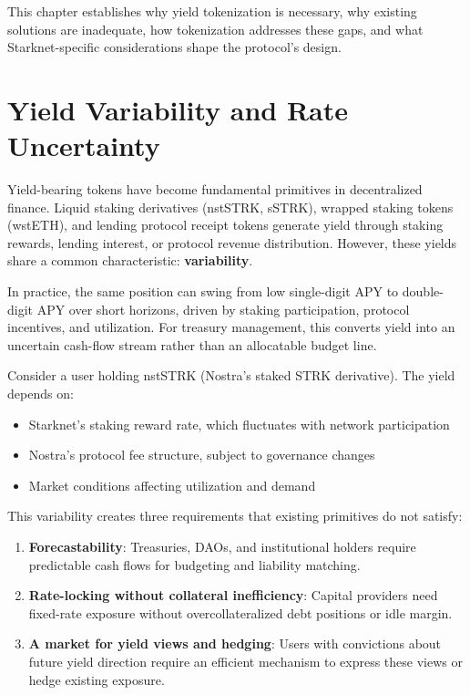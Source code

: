
This chapter establishes why yield tokenization is necessary, why existing solutions are inadequate, how tokenization addresses these gaps, and what Starknet-specific considerations shape the protocol's design.

\section{Yield Variability and Rate Uncertainty}

Yield-bearing tokens have become fundamental primitives in decentralized finance. Liquid staking derivatives (nstSTRK, sSTRK), wrapped staking tokens (wstETH), and lending protocol receipt tokens generate yield through staking rewards, lending interest, or protocol revenue distribution. However, these yields share a common characteristic: \textbf{variability}.

In practice, the same position can swing from low single-digit APY to double-digit APY over short horizons, driven by staking participation, protocol incentives, and utilization. For treasury management, this converts yield into an uncertain cash-flow stream rather than an allocatable budget line.

Consider a user holding nstSTRK (Nostra's staked STRK derivative). The yield depends on:
\begin{itemize}
    \item Starknet's staking reward rate, which fluctuates with network participation
    \item Nostra's protocol fee structure, subject to governance changes
    \item Market conditions affecting utilization and demand
\end{itemize}

This variability creates three requirements that existing primitives do not satisfy:

\begin{enumerate}
    \item \textbf{Forecastability}: Treasuries, DAOs, and institutional holders require predictable cash flows for budgeting and liability matching.

    \item \textbf{Rate-locking without collateral inefficiency}: Capital providers need fixed-rate exposure without overcollateralized debt positions or idle margin.

    \item \textbf{A market for yield views and hedging}: Users with convictions about future yield direction require an efficient mechanism to express these views or hedge existing exposure.
\end{enumerate}

